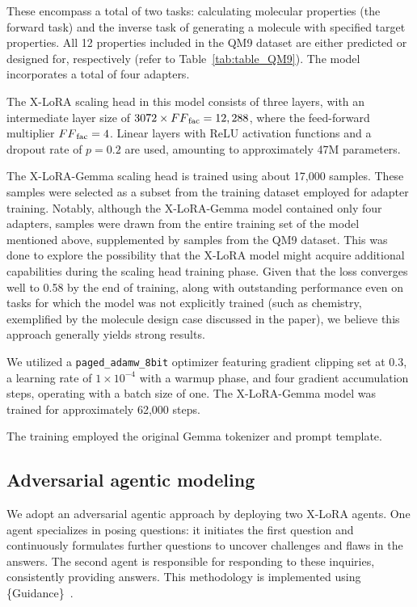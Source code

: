 These encompass a total of two tasks: calculating molecular properties (the forward task) and the inverse task of generating a molecule with specified target properties. All 12 properties included in the QM9 dataset are either predicted or designed for, respectively (refer to Table~\ref{tab:table_QM9}).  
The model incorporates a total of four adapters.  

The X-LoRA scaling head in this model consists of three layers, with an intermediate layer size of $3072\times {FF}_{\rm fac}=12,288$, where the feed-forward multiplier ${FF}_{\rm fac}=4$. Linear layers with ReLU activation functions and a dropout rate of $p=0.2$ are used, amounting to approximately 47M parameters.  

The X-LoRA-Gemma scaling head is trained using about 17,000 samples. These samples were selected as a subset from the training dataset employed for adapter training. Notably, although the X-LoRA-Gemma model contained only four adapters, samples were drawn from the entire training set of the model mentioned above, supplemented by samples from the QM9 dataset. This was done to explore the possibility that the X-LoRA model might acquire additional capabilities during the scaling head training phase. Given that the loss converges well to 0.58 by the end of training, along with outstanding performance even on tasks for which the model was not explicitly trained (such as chemistry, exemplified by the molecule design case discussed in the paper), we believe this approach generally yields strong results.

We utilized a \texttt{paged\_adamw\_8bit} optimizer featuring gradient clipping set at 0.3, a learning rate of $1\times 10^{-4}$ with a warmup phase, and four gradient accumulation steps, operating with a batch size of one. The X-LoRA-Gemma model was trained for approximately 62,000 steps.

The training employed the original Gemma tokenizer and prompt template.

\subsection{Adversarial agentic modeling} We adopt an adversarial agentic approach by deploying two X-LoRA agents. One agent specializes in posing questions: it initiates the first question and continuously formulates further questions to uncover challenges and flaws in the answers. The second agent is responsible for responding to these inquiries, consistently providing answers. This methodology is implemented using \{Guidance\}~\cite{Guidance-ai/guidance:Models.}.


